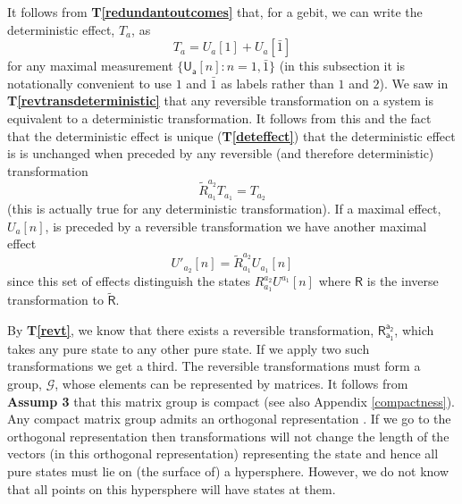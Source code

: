 \documentclass[10pt]{article}
\begin{document}
It follows from {\bf T\ref{redundantoutcomes}} that, for a gebit, we can write the deterministic effect, $T_a$, as
\begin{equation}
T_a= U_a[1] + U_a[\bar 1]
\end{equation}
for any maximal measurement $\{\mathsf{U_a}[n] : n=1, \bar 1 \}$ (in this subsection it is notationally convenient to use $1$ and $\bar 1$ as labels rather than $1$ and $2$).  We saw in {\bf T\ref{revtransdeterministic}} that any reversible transformation on a system is equivalent to a deterministic transformation.  It follows from this and the fact that the deterministic effect is unique ({\bf T\ref{deteffect}}) that the deterministic effect is is unchanged when preceded by any reversible (and therefore deterministic) transformation
\begin{equation}
\tilde R_{a_1}^{a_2} T_{a_1} = T_{a_2}
\end{equation}
(this is actually true for any deterministic transformation).   If a maximal effect, $U_a[n]$, is preceded by a reversible transformation we have another maximal effect
\begin{equation}
U'_{a_2}[n] = \tilde R_{a_1}^{a_2} U_{a_1}[n]
\end{equation}
since this set of effects distinguish the states $R_{a_1}^{a_2} U^{a_1}[n]$ where $\mathsf R$ is the inverse transformation to $\mathsf{\tilde R}$.

By {\bf T\ref{revt}}, we know that there exists a reversible transformation, $\mathsf{R_{a_1}^{a_2}}$, which takes any pure state to any other pure state.
If we apply two such transformations we get a third.  The reversible transformations must form a group, $\mathcal G$, whose elements can be represented by matrices.  It follows from {\bf Assump 3} that this matrix group is compact (see also Appendix \ref{compactness}).  Any compact matrix group admits an orthogonal representation \cite{boerner1970representations}.  If we go to the orthogonal representation then transformations will not change the length of the vectors (in this orthogonal representation) representing the state and hence all pure states must lie on (the surface of) a hypersphere. However, we do not know that all points on this hypersphere will have states at them.
\end{document}

